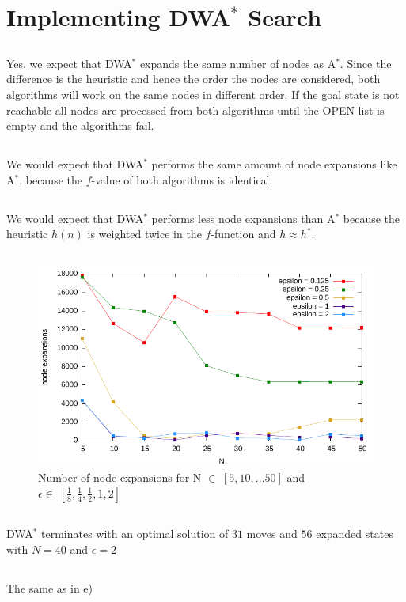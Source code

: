 \documentclass[11pt]{article}
\begin{document}
\setcounter{section}{6}
\section{Implementing DWA$^*$ Search}
\subsection{}
Yes, we expect that DWA$^*$ expands the same number of nodes as A$^*$. Since the difference is the heuristic and hence the order the nodes are considered, both algorithms will work on the same nodes in different order. If the goal state is not reachable all nodes are processed from both algorithms until the OPEN list is empty and the algorithms fail.
\subsection{}
We would expect that DWA$^*$ performs the same amount of node expansions like A$^*$, because the $f$-value of both algorithms is identical.
\subsection{}
We would expect that DWA$^*$ performs less node expansions than A$^*$ because the heuristic $h(n)$ is weighted twice in the $f$-function and $h\approx h^*$.

\subsection{}
\begin{figure}[H]
	\centering
  \includegraphics[width=\textwidth]{./result_eps.pdf}
  \caption{Number of node expansions for N $\in \;[5,10,...50]$ and $\epsilon \in \; [\frac{1}{8},\frac{1}{4},\frac{1}{2},1,2]$}
	\label{fig2}
\end{figure}

\subsection{}
DWA$^*$ terminates with an optimal solution of $31$ moves and $56$ expanded states with $N=40$ and $\epsilon=2$

\subsection{}
The same as in e)
\end{document}
